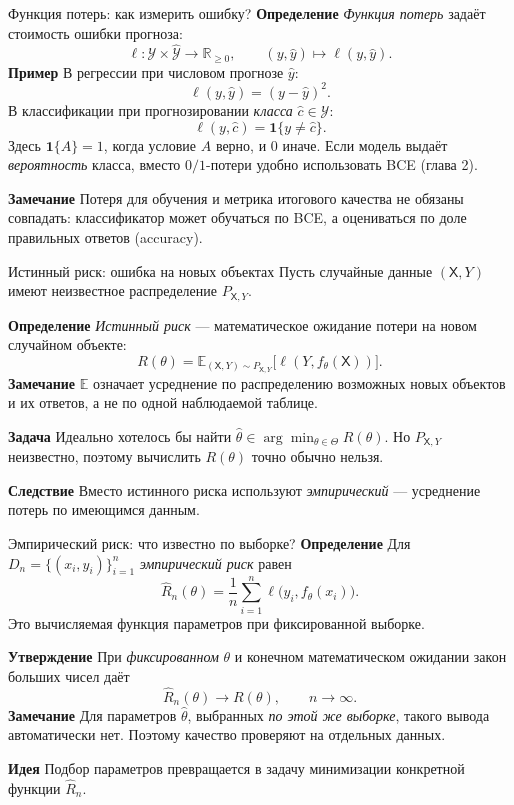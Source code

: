 \documentclass[10pt]{beamer}
\newcommand{\mlBody}{\normalsize}
\newcommand{\mlDefinition}{\textcolor{defblue}{\bfseries Определение}}
\newcommand{\mlStatement}{\textcolor{defblue}{\bfseries Утверждение}}
\newcommand{\mlRemark}{\textcolor{defblue}{\bfseries Замечание}}
\newcommand{\mlConsequence}{\textcolor{defblue}{\bfseries Следствие}}
\newcommand{\mlIdea}{\textcolor{defblue}{\bfseries Идея}}
\newcommand{\mlTask}{\textcolor{defblue}{\bfseries Задача}}
\newcommand{\mlExample}{\textcolor{defblue}{\bfseries Пример}}
\begin{document}
\begin{frame}{Функция потерь: как измерить ошибку?}
\mlBody
\mlDefinition\; \textit{Функция потерь} задаёт стоимость ошибки прогноза:
\[
 \ell:\mathcal Y\times\widehat{\mathcal Y}\to\mathbb R_{\ge0},
 \qquad (y,\hat y)\mapsto\ell(y,\hat y).
\]
\mlExample\; В регрессии при числовом прогнозе $\hat y$:
\[
 \boxed{\ell(y,\hat y)=(y-\hat y)^2}.
\]
В классификации при прогнозировании \emph{класса} $\hat c\in\mathcal Y$:
\[
 \boxed{\ell(y,\hat c)=\mathbf1\{y\ne\hat c\}}.
\]
Здесь $\mathbf1\{A\}=1$, когда условие $A$ верно, и $0$ иначе.
Если модель выдаёт \emph{вероятность} класса, вместо $0/1$-потери
удобно использовать BCE (глава 2).

\mlRemark\; Потеря для обучения и метрика итогового качества
не обязаны совпадать: классификатор может обучаться по BCE,
а оцениваться по доле правильных ответов (accuracy).
\end{frame}

\begin{frame}{Истинный риск: ошибка на новых объектах}
\mlBody
Пусть случайные данные $(\mathsf X,Y)$ имеют неизвестное распределение
$P_{\mathsf X,Y}$.

\mlDefinition\; \textit{Истинный риск} --- математическое ожидание потери
на новом случайном объекте:
\[
 \boxed{R(\theta)=\mathbb E_{(\mathsf X,Y)\sim P_{\mathsf X,Y}}
 \bigl[\ell(Y,f_\theta(\mathsf X))\bigr]}.
\]
\mlRemark\; $\mathbb E$ означает усреднение по распределению
возможных новых объектов и их ответов, а не по одной наблюдаемой таблице.

\mlTask\; Идеально хотелось бы найти
$\hat\theta\in\arg\min_{\theta\in\Theta}R(\theta)$.
Но $P_{\mathsf X,Y}$ неизвестно, поэтому вычислить $R(\theta)$ точно обычно нельзя.

\mlConsequence\; Вместо истинного риска используют \emph{эмпирический}
--- усреднение потерь по имеющимся данным.
\end{frame}

\begin{frame}{Эмпирический риск: что известно по выборке?}
\mlBody
\mlDefinition\; Для $D_n=\{(x_i,y_i)\}_{i=1}^n$
\textit{эмпирический риск} равен
\[
 \boxed{\widehat R_n(\theta)=\frac1n\sum_{i=1}^{n}
 \ell\bigl(y_i,f_\theta(x_i)\bigr)}.
\]
Это вычисляемая функция параметров при фиксированной выборке.

\mlStatement\; При \emph{фиксированном} $\theta$ и конечном
математическом ожидании закон больших чисел даёт
\[
 \widehat R_n(\theta)\longrightarrow R(\theta),\qquad n\to\infty.
\]
\mlRemark\; Для параметров $\hat\theta$, выбранных
\emph{по этой же выборке}, такого вывода автоматически нет.
Поэтому качество проверяют на отдельных данных.

\mlIdea\; Подбор параметров превращается в задачу минимизации
конкретной функции $\widehat R_n$.
\end{frame}
\end{document}
